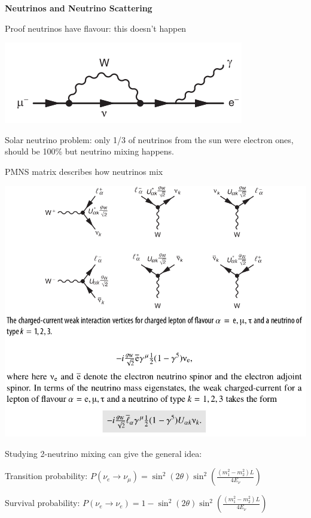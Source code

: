 \textbf{Neutrinos and Neutrino Scattering}

Proof neutrinos have flavour: this doesn't happen
\begin{center}
    \includegraphics[width=0.3\linewidth]{images/neutrino_flavour.png}
\end{center}

Solar neutrino problem: only 1/3 of neutrinos from the sun were electron ones, should be 100\% but neutrino mixing happens.

PMNS matrix describes how neutrinos mix

\begin{center}
    \includegraphics[width=\linewidth]{images/neutrino_production.png}
\end{center}

Studying 2-neutrino mixing can give the general idea:

Transition probability:
$P(\nu_e \to \nu_\mu) = \sin^2(2\theta) \sin^2(\frac{(m_1^2 - m_2^2) L}{4E_\nu})$

Survival probability:
$P(\nu_e \to \nu_e) = 1 - \sin^2(2\theta) \sin^2(\frac{(m_1^2 - m_2^2) L}{4E_\nu})$

